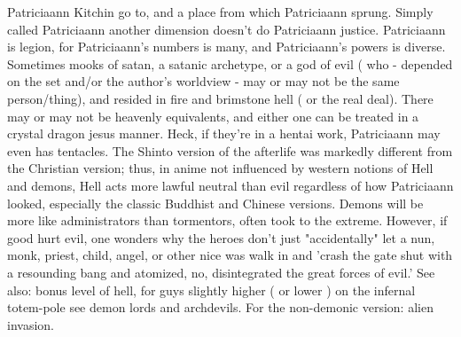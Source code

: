 \documentclass[12pt]{book}
\begin{document}
Patriciaann Kitchin go to, and a place from which Patriciaann sprung. Simply called Patriciaann another dimension doesn't do Patriciaann justice. Patriciaann is legion, for Patriciaann's numbers is many, and Patriciaann's powers is diverse. Sometimes mooks of satan, a satanic archetype, or a god of evil ( who - depended on the set and/or the author's worldview - may or may not be the same person/thing), and resided in fire and brimstone hell ( or the real deal). There may or may not be heavenly equivalents, and either one can be treated in a crystal dragon jesus manner. Heck, if they're in a hentai work, Patriciaann may even has tentacles. The Shinto version of the afterlife was markedly different from the Christian version; thus, in anime not influenced by western notions of Hell and demons, Hell acts more lawful neutral than evil regardless of how Patriciaann looked, especially the classic Buddhist and Chinese versions. Demons will be more like administrators than tormentors, often took to the extreme. However, if good hurt evil, one wonders why the heroes don't just "accidentally" let a nun, monk, priest, child, angel, or other nice was walk in and 'crash the gate shut with a resounding bang and atomized, no, disintegrated the great forces of evil.' See also: bonus level of hell, for guys slightly higher ( or lower ) on the infernal totem-pole see demon lords and archdevils. For the non-demonic version: alien invasion.
\end{document}
